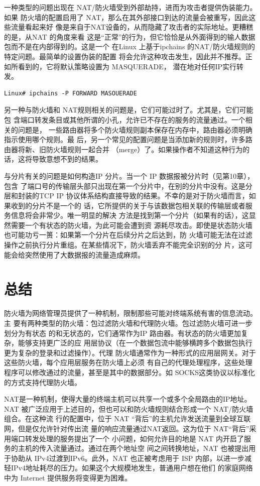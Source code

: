 一种类型的问题出现在 NAT/防火墙受到外部劫持，进而为攻击者提供伪装能力。如果
防火墙的配置启用了 NAT，那么在其外部接口到达的流量会被重写，因此这些流量看起来好
像是来自于NAT设备的，从而隐藏了攻击者的实际地址。更糟糕的是，从NAT 的角度来看
这是“正常”的行为，但它恰恰是从外面得到的输人数据包而不是在内部得到的。这是一个
在Linux 上基于ipchains 的NAT/防火墙规则的特定问题。最简单的设置伪装的配置
将会允许这种攻击发生，因此并不推荐。正如所看到的，它将默认策略设置为 MASQUERADE，
潜在地对任何IP实行转发。

\begin{verbatim}    
Linux# ipchains -P FORWARD MASOUERADE
\end{verbatim}


另一种与防火墙和 NAT规则相关的问题是，它们可能过时了。尤其是，它们可能包
含端口转发条目或其他所谓的小孔，允许已不存在的服务的流量通过。一个相关的问题是，
一些路由器将多个防火墙规则副本保存在内存中，路由器必须明确指示使用哪个规则。最
后，另一个常见的配置问题是当添加新的规则时，许多路由器将新、旧防火墙规则一起合并
（merge）了。如果操作者不知道这种行为的话，这将导致意想不到的结果。

与分片有关的问题是如何构造IP 分片。当一个 IP 数据报被分片时（见第10章），包含
了端口号的传输层头部只出现在第一个分片中，在别的分片中没有。这是分层和封装的TCP
IP 协议体系结构直接导致的结果。不幸的是对于防火墙而言，如果收到的分片不是一个的
话，它所提供的关于与该数据包相关联的传输层或者服务信息将会非常少。唯一明显的解决
方法是找到第一个分片（如果有的话），这显然需要一个有状态的防火墙，为此可能会遭到资
源耗尽攻击。即使是状态防火墙也可能功亏一篑：如果第一个分片在后续分片之后达到，防
火墙可能无法在过滤操作之前执行分片重组。在某些情况下，防火墙丢弃不能完全识别的分
片，这可能会给突然使用了大数据报的流量造成麻烦。

\section{总结}

防火墙为网络管理员提供了一种机制，限制那些可能对终端系统有害的信息流动。主
要有两种类型的防火墙：包过滤防火墙和代理防火墙。包过滤防火墙可进一步划分为有状态
的和无状态的，它们通常作为IP 路由器。有状态的防火墙更加复杂，能够支持更广泛的应
用层协议（在一个数据包流中能够横跨多个数据包执行更为复杂的登录和过滤操作）。代理
防火墙通常作为一种形式的应用层网关。对于这些防火墙，每个应用层服务在防火墙上必须
有自己的代理处理程序，这些处理程序可以修改通过的流量，甚至是其中的数据部分。如
SOCKS这类协议以标准化的方式支持代理防火墙。

NAT是一种机制，使得大量的终端主机可以共享一个或多个全局路由的IP地址。NAT
被广泛应用于上述目的，但也可以和防火墙规则结合形成一个 NAT/防火墙组合。在这种流
行的配置中，位于 NAT “背后”的主机允许发送流量到全球互联网，但是仅允许针对传出流
量的响应流量通过NAT返回。这为位于 NAT“背后”采用端口转发处理的服务提出了一个
小问题，如何允许目的地是 NAT 内开启了服务的主机的传入流量通过。通过在两个地址空
间之间转换地址，NAT 也被提出用于协助从 IPv4过渡到IPv6。此外，NAT 也正被考虑用于
ISP 内部，以进一步减轻IPv4地址耗尽的压力。如果这个大规模地发生，普通用户想在他们
的家庭网络中为 Internet 提供服务将变得更为困难。

